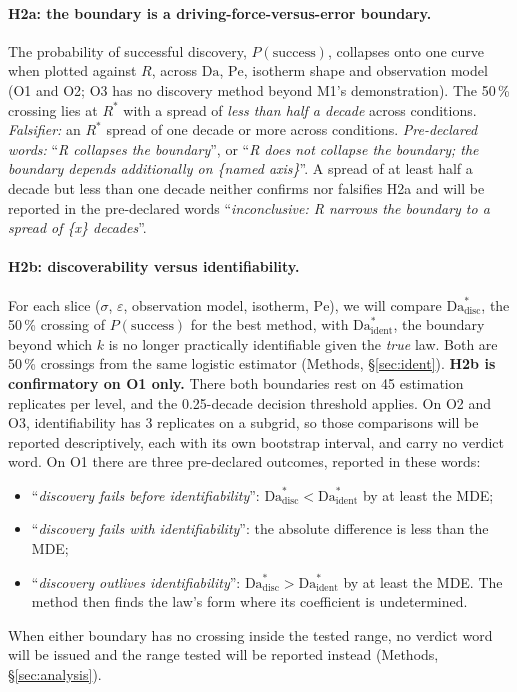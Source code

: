 \documentclass[11pt]{article}
\newcommand{\Da}{\mathrm{Da}}
\newcommand{\Pe}{\mathrm{Pe}}
\newcommand{\verdict}[1]{``\textit{#1}''}
\begin{document}
\paragraph{H2a: the boundary is a driving-force-versus-error boundary.}
The probability of successful discovery, $P(\text{success})$, collapses onto one curve
when plotted against $R$, across $\Da$, $\Pe$, isotherm shape and observation model (O1
and O2; O3 has no discovery method beyond M1's demonstration). The
50\,\% crossing lies at $R^{*}$ with a spread of \emph{less than half a decade} across
conditions.
\emph{Falsifier:} an $R^{*}$ spread of one decade or more across conditions.
\emph{Pre-declared words:} \verdict{R collapses the boundary}, or
\verdict{R does not collapse the boundary; the boundary depends additionally on
\{named axis\}}.
A spread of at least half a decade but less than one decade neither confirms nor
falsifies H2a and will be reported in the pre-declared words \verdict{inconclusive: R
narrows the boundary to a spread of \{x\} decades}.

\paragraph{H2b: discoverability versus identifiability.}
For each slice ($\sigma$, $\varepsilon$, observation model, isotherm, $\Pe$), we will compare
$\Da^{*}_{\mathrm{disc}}$, the 50\,\% crossing of $P(\text{success})$ for the best method,
with $\Da^{*}_{\mathrm{ident}}$, the boundary beyond which $k$ is no longer practically
identifiable given the \emph{true} law. Both are 50\,\% crossings from the same logistic
estimator (Methods, \S\ref{sec:ident}). \textbf{H2b is confirmatory on O1 only.} There
both boundaries rest on 45 estimation replicates per level, and the 0.25-decade decision
threshold applies. On O2
and O3, identifiability has 3 replicates on a subgrid, so those comparisons will be
reported descriptively, each with its own bootstrap interval, and carry no verdict word.
On O1 there are three pre-declared outcomes, reported in these words:
\begin{itemize}
\item \verdict{discovery fails before identifiability}: $\Da^{*}_{\mathrm{disc}} <
\Da^{*}_{\mathrm{ident}}$ by at least the MDE;
\item \verdict{discovery fails with identifiability}: the absolute difference is less than
the MDE;
\item \verdict{discovery outlives identifiability}: $\Da^{*}_{\mathrm{disc}} >
\Da^{*}_{\mathrm{ident}}$ by at least the MDE. The method then finds the law's form where
its coefficient is undetermined.
\end{itemize}
When either boundary has no crossing inside the tested range, no verdict word will be
issued and the range tested will be reported instead (Methods, \S\ref{sec:analysis}).
\end{document}
